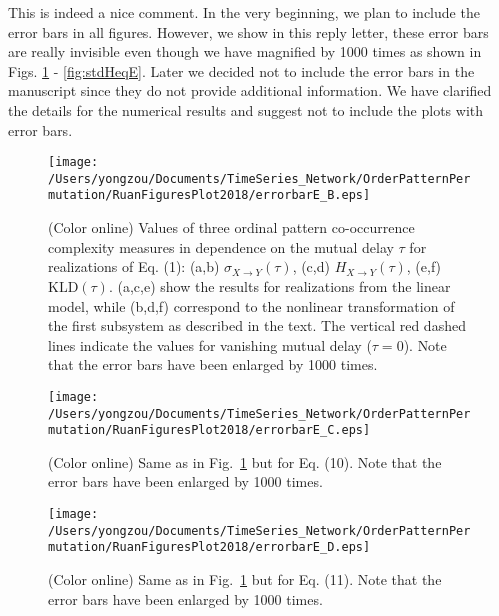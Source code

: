 \documentclass[aps,chaos,superscriptaddress,showkeys]{revtex4}
\begin{document}
\begin{center}
\begin{minipage}[c]{0.9\textwidth}
This is indeed a nice comment. In the very beginning, we plan to include the error bars in all figures. However, we show in this reply letter, these error bars are really invisible even though we have magnified by 1000 times as shown in Figs. \ref{fig:stdHeqB} - \ref{fig:stdHeqE}. Later we decided not to include the error bars in the manuscript since they do not provide additional information. We have clarified the details for the numerical results and suggest not to include the plots with error bars.

\end{minipage}
\end{center}
\begin{figure}
	\centering
	\texttt{[image: /Users/yongzou/Documents/TimeSeries\_Network/OrderPatternPermutation/RuanFiguresPlot2018/errorbarE\_B.eps]}
\caption{(Color online) Values of three ordinal pattern co-occurrence complexity measures in dependence on the mutual delay $\tau$ for realizations of Eq. (1): (a,b) $\sigma_{X\to Y}(\tau)$, (c,d) $H_{X \to Y}(\tau)$, (e,f) $\text{KLD}(\tau)$. (a,c,e) show the results for realizations from the linear model, while (b,d,f) correspond to the nonlinear transformation of the first subsystem as described in the text. The vertical red dashed lines indicate the values for vanishing mutual delay ($\tau=0$). {\color{red}Note that the error bars have been enlarged by 1000 times.} \label{fig:stdHeqB}}
\end{figure}

\begin{figure}
	\centering
	\texttt{[image: /Users/yongzou/Documents/TimeSeries\_Network/OrderPatternPermutation/RuanFiguresPlot2018/errorbarE\_C.eps]}
\caption{(Color online) Same as in Fig.~\ref{fig:stdHeqB} but for Eq. (10). {\color{red}Note that the error bars have been enlarged by 1000 times.} \label{fig:stdHeqC}}
\end{figure}

\begin{figure}
	\centering
	\texttt{[image: /Users/yongzou/Documents/TimeSeries\_Network/OrderPatternPermutation/RuanFiguresPlot2018/errorbarE\_D.eps]}
\caption{(Color online) Same as in Fig.~\ref{fig:stdHeqB} but for Eq. (11).  {\color{red}Note that the error bars have been enlarged by 1000 times.} \label{fig:stdHeqD}}
\end{figure}
\end{document}
